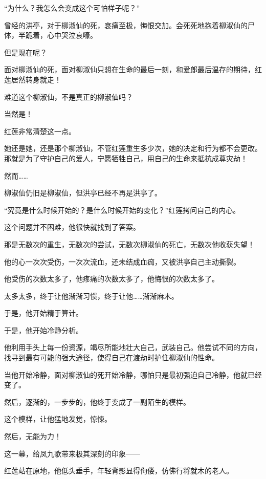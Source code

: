 
\begin{this_body}

“为什么？我怎么会变成这个可怕样子呢？”

曾经的洪亭，对于柳淑仙的死，哀痛至极，悔恨交加。会死死地抱着柳淑仙的尸体，半跪着，心中哭泣哀嚎。

但是现在呢？

面对柳淑仙的死，面对柳淑仙只想在生命的最后一刻，和爱郎最后温存的期待，红莲居然转身就走！

难道这个柳淑仙，不是真正的柳淑仙吗？

当然是！

红莲非常清楚这一点。

她还是她，还是那个柳淑仙，不管红莲重生多少次，她的决定和行为都不会更改。那就是为了守护自己的爱人，宁愿牺牲自己，用自己的生命来抵抗成尊灾劫！

然而……

柳淑仙仍旧是柳淑仙，但洪亭已经不再是洪亭了。

“究竟是什么时候开始的？是什么时候开始的变化？”红莲拷问自己的内心。

这个问题并不困难，他很快就找到了答案。

那是无数次的重生，无数次的尝试，无数次柳淑仙的死亡，无数次他收获失望！

他的心一次次受伤，一次次流血，还未结成血痂，又被洪亭自己主动撕裂。

他受伤的次数太多了，他疼痛的次数太多了，他悔恨的次数太多了。

太多太多，终于让他渐渐习惯，终于让他……渐渐麻木。

于是，他开始精于算计。

于是，他开始冷静分析。

他利用手头上每一份资源，竭尽所能地壮大自己，武装自己。他尝试不同的方向，找寻到最有可能的强大途径，使得自己在渡劫时护住柳淑仙的性命。

当他开始冷静，面对柳淑仙的死开始冷静，哪怕只是最初强迫自己冷静，他就已经变了。

然后，逐渐的，一步步的，他终于变成了一副陌生的模样。

这个模样，让他猛地发觉，惊悚。

然后，无能为力！

这一幕，给凤九歌带来极其深刻的印象——

红莲站在原地，他低头垂手，年轻背影显得佝偻，仿佛行将就木的老人。


\end{this_body}

